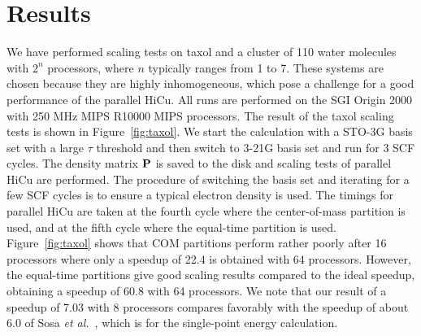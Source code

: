 \documentclass[preprint]{revtex4}
\begin{document}

\section{Results}
\label{sec:results}

We have performed scaling tests on taxol and a cluster of 110 water
molecules with $2^n$ processors, where $n$ typically ranges from 1 to
7.  These systems are chosen because they are highly inhomogeneous,
which pose a challenge for a good performance of the parallel HiCu.
All runs are performed on the SGI Origin 2000 with 250 MHz MIPS R10000
MIPS processors.  The result of the taxol scaling tests is shown in
Figure~\ref{fig:taxol}.
We start the calculation with a STO-3G basis set with a large $\tau$
threshold and then switch to 3-21G basis set and run for 3 SCF cycles.
The density matrix ${\bf P}$ is saved to the disk and scaling tests of
parallel HiCu are performed.  The procedure of switching the basis set
and iterating for a few SCF cycles is to ensure a typical electron density is
used.  The timings for parallel HiCu are taken at the fourth cycle
where the center-of-mass partition is used, and at the fifth cycle
where the equal-time partition is used.  Figure~\ref{fig:taxol}
shows that COM partitions perform rather poorly after 16 processors
where only a speedup of 22.4 is obtained with 64 processors.  However,
the equal-time partitions give good scaling results compared to the
ideal speedup, obtaining a speedup of 60.8 with 64 processors.  We
note that our result of a speedup of 7.03 with 8 processors compares
favorably with the speedup of about 6.0 of Sosa {\it et
al.}~\cite{Sosa_00v26}, which is for the single-point energy
calculation.
\end{document}
